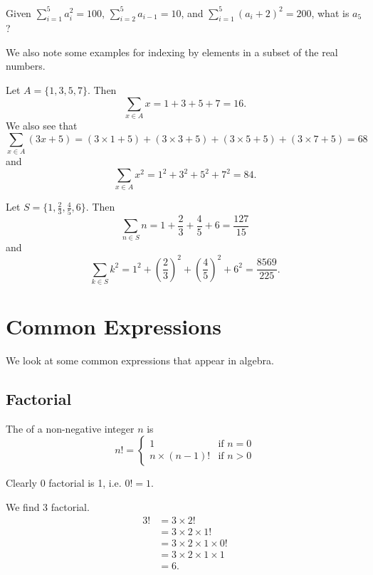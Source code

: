 \begin{exercise}
    Given $\displaystyle \sum_{i=1}^5a_i^2 = 100$, $\displaystyle \sum_{i=2}^5a_{i-1} = 10$, and $\displaystyle \sum_{i=1}^5(a_i+2)^2 = 200$, what is $a_5$?
\end{exercise}

We also note some examples for indexing by elements in a subset of the real numbers.
\begin{example}
    Let $A = \{1, 3, 5, 7\}$. Then
    \[
        \sum_{x \in A} x = 1 + 3 + 5 + 7 = 16.
    \]
    We also see that
    \[
        \sum_{x \in A}(3x + 5) = (3\times1 + 5) + (3\times3 + 5) + (3\times5 + 5) + (3\times7 + 5) = 68
    \]
    and
    \[
        \sum_{x\in A}x^2 = 1^2 + 3^2 + 5^2 + 7^2 = 84.
    \]
\end{example}
\begin{example}
    Let $S = \{1, \frac23, \frac45, 6\}$. Then
    \[
        \sum_{n \in S}n = 1 + \frac23 + \frac45 + 6 = \frac{127}{15}
    \]
    and
    \[
        \sum_{k \in S}k^2 = 1^2 + \left(\frac23\right)^2 + \left(\frac45\right)^2 + 6^2 = \frac{8569}{225}.
    \]
\end{example}

\newpage

\section{Common Expressions}
We look at some common expressions that appear in algebra.

\subsection{Factorial}
\begin{definition}
    The  of a non-negative integer $n$ is
    \[
        n! = \begin{cases}
            1 & \text{if } n = 0\\
            n \times (n-1)! & \text{if } n > 0
        \end{cases}
    \]
\end{definition}

\begin{example}
    Clearly 0 factorial is 1, i.e. $0! = 1$.
\end{example}

\begin{example}
    We find 3 factorial.
    \begin{align*}
        3! &= 3 \times 2!\\
        &= 3 \times 2 \times 1!\\
        &= 3 \times 2 \times 1 \times 0!\\
        &= 3 \times 2  \times 1  \times 1\\
        &= 6.
    \end{align*}
\end{example}

